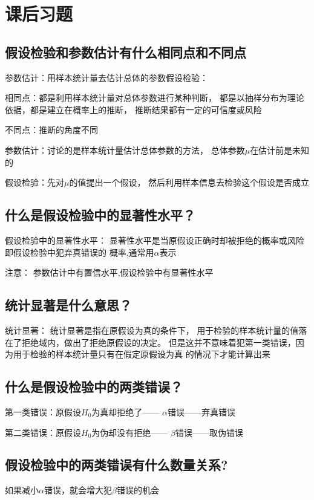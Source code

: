 \documentclass[UTF8,10pt]{book}
\begin{document}
    \section{课后习题}
    {\kaishu
    \subsection{假设检验和参数估计有什么相同点和不同点}	
    参数估计：用样本统计量去估计总体的参数假设检验： 
    
    相同点：都是利用样本统计量对总体参数进行某种判断，
    都是以抽样分布为理论依据，都是建立在概率上的推断，
    推断结果都有一定的可信度或风险 
    
    不同点：推断的角度不同 
    
    参数估计：讨论的是样本统计量估计总体参数的方法，
    总体参数$\mu$在估计前是未知的 
    
    假设检验：先对$\mu$的值提出一个假设，
    然后利用样本信息去检验这个假设是否成立

    \subsection{什么是假设检验中的显著性水平？}	
    假设检验中的显著性水平： 
    显著性水平是当原假设正确时却被拒绝的概率或风险即假设检验中犯弃真错误的
    概率,通常用$\alpha$表示 
    
    注意： 参数估计中有置信水平,假设检验中有显著性水平

    \subsection{统计显著是什么意思？}	
    
    统计显著： 统计显著是指在原假设为真的条件下，
    用于检验的样本统计量的值落在了拒绝域内，做出了拒绝原假设的决定。
    但是这并不意味着犯第一类错误，因为用于检验的样本统计量只有在假定原假设为真
    的情况下才能计算出来

    \subsection{什么是假设检验中的两类错误？}	
    第一类错误：原假设$H_0$为真却拒绝了—— $ \alpha $错误——弃真错误 
    
    第二类错误：原假设$H_0$为伪却没有拒绝—— $ \beta $错误——取伪错误

    \subsection{假设检验中的两类错误有什么数量关系?}	
    如果减小$\alpha$错误，就会增大犯$\beta$错误的机会
    
}
\end{document}
